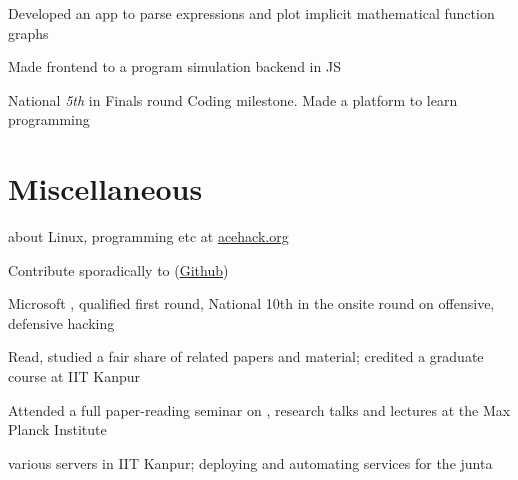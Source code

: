 \documentclass[a4paper]{deedy-resume} %
\begin{document}
\begin{minipage}[t]{0.66\textwidth}
  \sectionspace

  \runsubsection{}
  \begin{tightitemize}
  \item Developed an app to parse expressions and
    plot implicit mathematical function graphs
  \item Made frontend to a program simulation backend in JS
  \item National \textit{5th} in Finals round Coding milestone.
    Made a platform to learn programming
  \end{tightitemize}

  \section{Miscellaneous}
  \vspace{\topsep}
  \begin{tightitemize}
  \item {} about Linux, programming etc at
    \href{http://acehack.org}{acehack.org}
  \item Contribute sporadically to 
    (\href{https://github.com/sakshamsharma}{Github})
  \item Microsoft , qualified first round,
    National 10th in the onsite round on offensive, defensive hacking
  \item Read, studied a fair share of  related
    papers and material; credited a graduate course at IIT Kanpur
  \item	Attended a full paper-reading seminar on , research talks and lectures at the Max Planck Institute
  \item {} various servers in IIT Kanpur; deploying and
    automating services for the junta
  \end{tightitemize}

\end{minipage}



\end{document}
